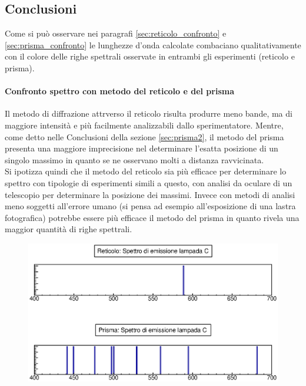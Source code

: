 \clearpage
\subsection{Conclusioni}
Come si può osservare nei paragrafi \ref{sec:reticolo_confronto} e \ref{sec:prisma_confronto} le lunghezze d'onda calcolate combaciano qualitativamente con il colore delle righe spettrali osservate in entrambi gli esperimenti (reticolo e prisma).

\paragraph{Confronto spettro con metodo del reticolo e del prisma}
%
{Il metodo di diffrazione attrverso il reticolo risulta produrre meno bande, ma di maggiore intensità e più facilmente analizzabili dallo sperimentatore. Mentre, come detto nelle Conclusioni della sezione \ref{sec:prisma2}, il metodo del prisma presenta una maggiore imprecisione nel determinare l'esatta posizione di un singolo massimo in quanto se ne osservano molti a distanza ravvicinata.\\
Si ipotizza quindi che il metodo del reticolo sia più efficace per determinare lo spettro con tipologie di esperimenti simili a questo, con analisi da oculare di un telescopio per determinare la posizione dei massimi. Invece con metodi di analisi meno soggetti all'errore umano (si pensa ad esempio all'esposizione di una lastra fotografica) potrebbe essere più efficace il metodo del prisma in quanto rivela una maggior quantità di righe spettrali.}
%
%
    \begin{figure}[H]
    \centering
    \includegraphics[scale=0.8]{Grafici/O3_C_lampadaC_spectrum.eps}
    \label{fig:C3_P2_RL}
    \end{figure} 
%
